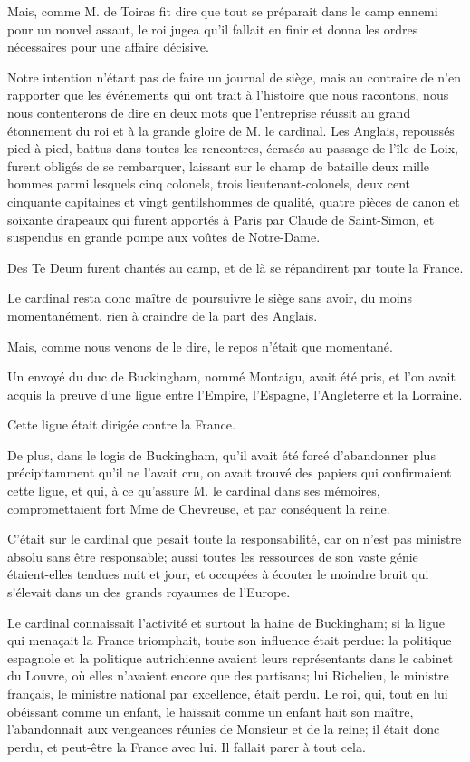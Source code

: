 Mais, comme M. de Toiras fit dire que tout se préparait dans le camp ennemi pour un nouvel assaut, le roi jugea qu'il fallait en finir et donna les ordres nécessaires pour une affaire décisive. 

Notre intention n'étant pas de faire un journal de siège, mais au contraire de n'en rapporter que les événements qui ont trait à l'histoire que nous racontons, nous nous contenterons de dire en deux mots que l'entreprise réussit au grand étonnement du roi et à la grande gloire de M. le cardinal. Les Anglais, repoussés pied à pied, battus dans toutes les rencontres, écrasés au passage de l'île de Loix, furent obligés de se rembarquer, laissant sur le champ de bataille deux mille hommes parmi lesquels cinq colonels, trois lieutenant-colonels, deux cent cinquante capitaines et vingt gentilshommes de qualité, quatre pièces de canon et soixante drapeaux qui furent apportés à Paris par Claude de Saint-Simon, et suspendus en grande pompe aux voûtes de Notre-Dame. 

Des Te Deum furent chantés au camp, et de là se répandirent par toute la France. 

Le cardinal resta donc maître de poursuivre le siège sans avoir, du moins momentanément, rien à craindre de la part des Anglais. 

Mais, comme nous venons de le dire, le repos n'était que momentané. 

Un envoyé du duc de Buckingham, nommé Montaigu, avait été pris, et l'on avait acquis la preuve d'une ligue entre l'Empire, l'Espagne, l'Angleterre et la Lorraine. 

Cette ligue était dirigée contre la France. 

De plus, dans le logis de Buckingham, qu'il avait été forcé d'abandonner plus précipitamment qu'il ne l'avait cru, on avait trouvé des papiers qui confirmaient cette ligue, et qui, à ce qu'assure M. le cardinal dans ses mémoires, compromettaient fort Mme de Chevreuse, et par conséquent la reine. 

C'était sur le cardinal que pesait toute la responsabilité, car on n'est pas ministre absolu sans être responsable; aussi toutes les ressources de son vaste génie étaient-elles tendues nuit et jour, et occupées à écouter le moindre bruit qui s'élevait dans un des grands royaumes de l'Europe. 

Le cardinal connaissait l'activité et surtout la haine de Buckingham; si la ligue qui menaçait la France triomphait, toute son influence était perdue: la politique espagnole et la politique autrichienne avaient leurs représentants dans le cabinet du Louvre, où elles n'avaient encore que des partisans; lui Richelieu, le ministre français, le ministre national par excellence, était perdu. Le roi, qui, tout en lui obéissant comme un enfant, le haïssait comme un enfant hait son maître, l'abandonnait aux vengeances réunies de Monsieur et de la reine; il était donc perdu, et peut-être la France avec lui. Il fallait parer à tout cela. 

